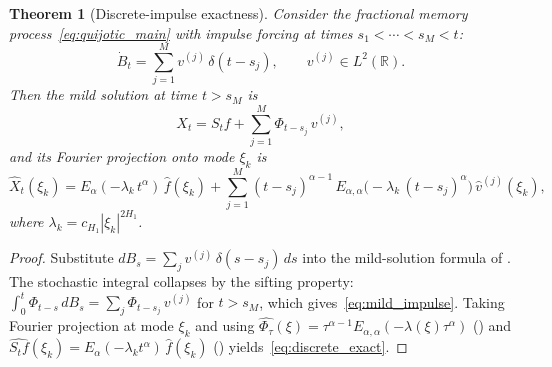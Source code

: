 \documentclass[11pt]{article}
\newtheorem{theorem}{Theorem}[section]
\theoremstyle{definition}
\theoremstyle{remark}
\newcommand{\R}{\mathbb{R}}
\begin{document}
\begin{theorem}[Discrete-impulse exactness]
\label{thm:discretization}
Consider the fractional memory
process~\eqref{eq:quijotic_main} with impulse forcing
at times $s_1 < \cdots < s_M < t$:
\[
\dot{B}_t = \sum_{j=1}^M v^{(j)}\,\delta(t - s_j),
\qquad v^{(j)} \in L^2(\R).
\]
Then the mild solution at time $t > s_M$ is
\begin{equation}\label{eq:mild_impulse}
X_t = S_t f + \sum_{j=1}^M \Phi_{t-s_j}\, v^{(j)},
\end{equation}
and its Fourier projection onto mode $\xi_k$ is
\begin{equation}\label{eq:discrete_exact}
\hat{X}_t(\xi_k)
= E_\alpha(-\lambda_k\,t^\alpha)\,\hat{f}(\xi_k)
+ \sum_{j=1}^M
(t - s_j)^{\alpha-1}\,
E_{\alpha,\alpha}\bigl(-\lambda_k\,(t - s_j)^\alpha\bigr)\,
\hat{v}^{(j)}(\xi_k),
\end{equation}
where $\lambda_k = c_{H_1}|\xi_k|^{2H_1}$.
\end{theorem}

\begin{proof}
Substitute $dB_s = \sum_j v^{(j)}\,\delta(s - s_j)\,ds$
into the mild-solution formula of .
The stochastic integral collapses by the sifting
property:
$\int_0^t \Phi_{t-s}\,dB_s
= \sum_j \Phi_{t-s_j}\,v^{(j)}$
for $t > s_M$, which gives~\eqref{eq:mild_impulse}.
Taking Fourier projection at mode $\xi_k$ and using
$\widehat{\Phi_\tau}(\xi) = \tau^{\alpha-1}
E_{\alpha,\alpha}(-\lambda(\xi)\tau^\alpha)$
()
and $\widehat{S_t f}(\xi_k)
= E_\alpha(-\lambda_k t^\alpha)\,\hat{f}(\xi_k)$
()
yields~\eqref{eq:discrete_exact}.
\end{proof}
\end{document}
